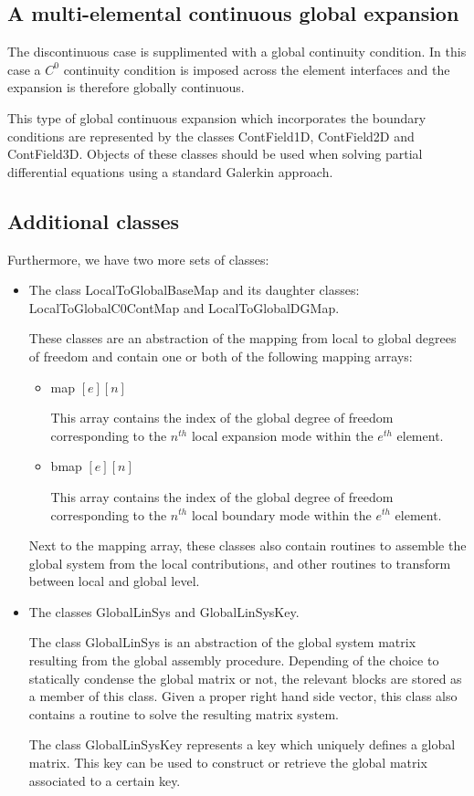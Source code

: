 \subsection{A multi-elemental continuous global expansion}
The discontinuous case is supplimented with a global continuity condition. In
this case a $C^0$ continuity condition is imposed across the element
interfaces and the expansion is therefore globally continuous.

This type of global continuous expansion which incorporates the boundary
 conditions are represented by the classes ContField1D, ContField2D and
 ContField3D. Objects of these classes should be used when solving partial
 differential equations using a standard Galerkin approach.


\subsection{Additional classes}
Furthermore, we have two more sets of classes:
\begin{itemize}
\item The class LocalToGlobalBaseMap and its daughter classes:
  LocalToGlobalC0ContMap and LocalToGlobalDGMap.
  
  These classes are an abstraction of the mapping from local to global degrees
  of freedom and contain one or both of the following mapping arrays:
  \begin{itemize}
  \item map $[e][n]$

    This array contains the index of the global degree of freedom corresponding
    to the $n^{th}$ local expansion mode within the $e^{th}$ element.
  \item bmap $[e][n]$
  
    This array contains the index of the global degree of freedom corresponding
    to the $n^{th}$ local boundary mode within the
    $e^{th}$ element.
  \end{itemize}
  Next to the mapping array, these classes also contain routines to assemble the
  global system from the local contributions, and other routines to transform
  between local and global level.
\item The classes GlobalLinSys and GlobalLinSysKey.

  The class GlobalLinSys is an abstraction of the global system matrix
  resulting from the global assembly procedure. Depending of the choice to
  statically condense the global matrix or not, the relevant blocks are stored
  as a member of this class. Given a proper right hand side vector, this class
  also contains a routine to solve the resulting matrix system.
  
  The class GlobalLinSysKey represents a key which uniquely defines a global
  matrix. This key can be used to construct or retrieve the global matrix 
  associated to a certain key.
\end{itemize}

